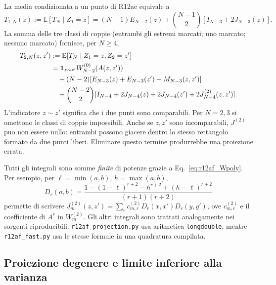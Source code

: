 \documentclass[11pt,a4paper]{article}
\begin{document}
La media condizionata a un punto di R12ae equivale a
\begin{equation}
 T_{1,N}(z):=\mathbb E[T_N\mid Z_1=z]=(N-1)E_{N-2}(z)
 +\binom{N-1}{2}[I_{N-3}+2J_{N-3}(z)].
 \label{eq:r12af_T1}
\end{equation}
La somma delle tre classi di coppie (entrambi gli estremi marcati; uno marcato; nessuno marcato) fornisce, per $N\ge4$,
\begin{align}
 T_{2,N}(z,z')&:=\mathbb E[T_N\mid Z_1=z,Z_2=z']\\
 &=\mathbf 1_{z\sim z'}W_{N-2}^{(0)}(A(z,z'))\notag\\
 &\quad +(N-2)[E_{N-3}(z)+E_{N-3}(z')+M_{N-3}(z,z')]\notag\\
 &\quad +\binom{N-2}{2}[I_{N-4}+2J_{N-4}(z)+2J_{N-4}(z')+2J_{N-4}^{(2)}(z,z')].
 \label{eq:r12af_T2}
\end{align}
L'indicatore $z\sim z'$ significa che i due punti sono comparabili. Per $N=2,3$ si omettono le classi di coppie impossibili. Anche se $z,z'$ sono incomparabili, $J^{(2)}$ puo non essere nullo: entrambi possono giacere dentro lo stesso rettangolo formato da due punti liberi. Eliminare questo termine produrrebbe una proiezione errata.

Tutti gli integrali sono somme \emph{finite} di potenze grazie a Eq.~\eqref{eq:r12af_Wpoly}. Per esempio, per $\ell=\min(a,b)$, $h=\max(a,b)$,
\begin{equation}
 D_r(a,b)=\frac{1-(1-\ell)^{r+2}-h^{r+2}+(h-\ell)^{r+2}}{(r+1)(r+2)}
 \label{eq:r12af_Dtwo}
\end{equation}
permette di scrivere $J_m^{(2)}(z,z')=\sum_r c_{m,r}^{(2)}D_r(x,x')D_r(y,y')$, ove $c_{m,r}^{(2)}$ e il coefficiente di $A^r$ in $W_m^{(2)}$. Gli altri integrali sono trattati analogamente nei sorgenti riproducibili: \texttt{r12af\_projection.py} usa aritmetica \texttt{longdouble}, mentre \texttt{r12af\_fast.py} usa le stesse formule in una quadratura compilata.

\subsection{Proiezione degenere e limite inferiore alla varianza}
\end{document}
